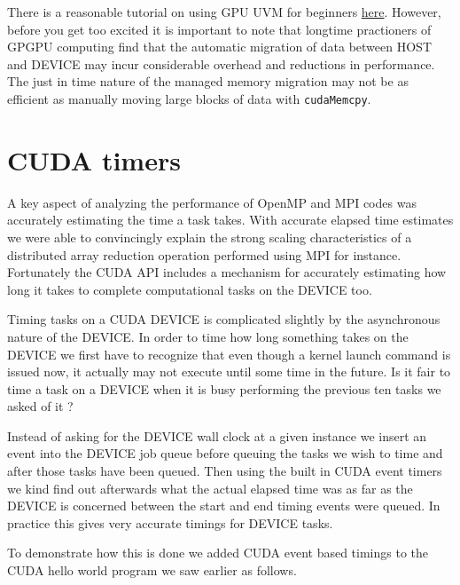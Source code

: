 There is a reasonable tutorial  on using GPU UVM for beginners \href{https://devblogs.nvidia.com/unified-memory-cuda-beginners/}{here}. However, before you get too excited it is important to note that longtime practioners of GPGPU computing find that the automatic migration of data between HOST and DEVICE may incur considerable overhead and reductions in performance. The just in time nature of the managed memory migration may not be as efficient as manually moving large blocks of data with \texttt{cudaMemcpy}.

\section{CUDA timers}


A key aspect of analyzing the performance of OpenMP and MPI codes was accurately estimating the time a task takes. With accurate elapsed time estimates we were able to convincingly explain the strong scaling characteristics of a distributed array reduction operation performed using MPI for instance. Fortunately the CUDA API includes a mechanism for accurately estimating how long it takes to complete computational tasks on the DEVICE too.

Timing tasks on a CUDA DEVICE is complicated slightly by the asynchronous nature of the DEVICE. In order to time how long something takes on the DEVICE we first have to recognize that even though a kernel launch command is issued now, it actually may not execute until some time in the future. Is it fair to time a task on a DEVICE when it is busy performing the previous ten tasks we asked of it ?

Instead of asking for the DEVICE wall clock at a given instance we insert an event into the DEVICE job queue before queuing the tasks we wish to time and after those tasks have been queued. Then using the built in CUDA event timers we kind find out afterwards what the actual elapsed time was as far as the DEVICE is concerned between the start and end timing events were queued. In practice this gives very accurate timings for DEVICE tasks.

To demonstrate how this is done we added CUDA event based timings to the CUDA hello world program we saw earlier as follows.

